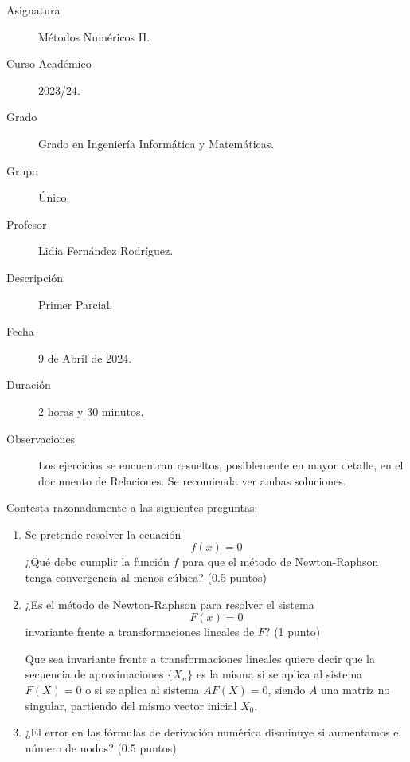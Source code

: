 \documentclass[12pt]{article}
\begin{document}

    
    

    \begin{description}
        \item[Asignatura] Métodos Numéricos II.
        \item[Curso Académico] 2023/24.
        \item[Grado] Grado en Ingeniería Informática y Matemáticas.
        \item[Grupo] Único.
        \item[Profesor] Lidia Fernández Rodríguez.
        \item[Descripción] Primer Parcial.
        \item[Fecha] 9 de Abril de 2024.
        \item[Duración] 2 horas y 30 minutos.
        \item[Observaciones] Los ejercicios se encuentran resueltos, posiblemente en mayor detalle, en el documento de Relaciones. Se recomienda ver ambas soluciones.
    \end{description}
    \newpage


    
    \begin{ejercicio}[2 puntos]
        Contesta razonadamente a las siguientes preguntas:
        \begin{enumerate}
          \item Se pretende resolver la ecuación $$ f(x) = 0 $$ ¿Qué debe cumplir la función \( f \) para que el método de Newton-Raphson tenga convergencia al menos cúbica? (0.5 puntos)
          \item ¿Es el método de Newton-Raphson para resolver el sistema $$ F(x) = 0 $$ invariante frente a transformaciones lineales de \( F \)?  (1 punto)
          \begin{observacion}
          Que sea invariante frente a transformaciones lineales quiere decir que la secuencia de aproximaciones $\{X_n\}$ es la misma si se aplica al sistema \( F(X) = 0 \) o si se aplica al sistema $AF(X) = 0$, 
          siendo \( A \) una matriz no singular, partiendo del mismo vector inicial \( X_0 \).
          \end{observacion}
          \item ¿El error en las fórmulas de derivación numérica disminuye si aumentamos el número de nodos? (0.5 puntos)
        \end{enumerate}
    \end{ejercicio}
        
\end{document}
